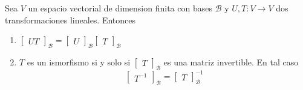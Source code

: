\documentclass{article}
\theoremstyle{definition}
\theoremstyle{definition}
\theoremstyle{remark}
\begin{document}
\begin{corol}
Sea $V$ un espacio vectorial de dimension finita con bases $\mathcal{B}$ y $U,T : V \to V$ dos transformaciones lineales. Entonces \begin{enumerate}[label=(\arabic*)]
  \item $\begin{bmatrix}UT\end{bmatrix}_{\mathcal{B}}=\begin{bmatrix}U\end{bmatrix}_{\mathcal{B}}\begin{bmatrix}T\end{bmatrix}_{\mathcal{B}}$
  \item $T$ es un ismorfismo si y solo si $\begin{bmatrix}T\end{bmatrix}_\mathcal{B}$ es una matriz invertible. En tal caso \[
    \begin{bmatrix}T^{-1}\end{bmatrix}_{\mathcal{B}}=\begin{bmatrix}T\end{bmatrix}^{-1}_{\mathcal{B}}
  \]
\end{enumerate}
\end{corol} \pagebreak
\end{document}

